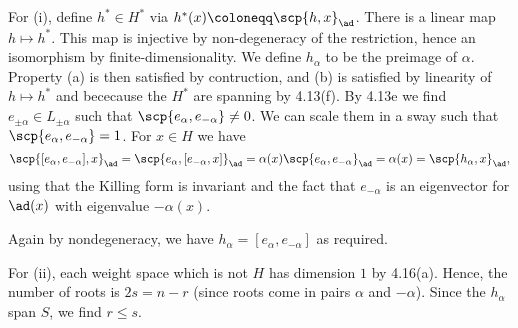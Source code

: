 For (i), define $h^* \in H^*$ via $h^*(x)\coloneqq \scp{h, x}_{\ad}$.
There is a linear map $h\mapsto h^*$. This map is injective by
non-degeneracy of the restriction, hence an isomorphism by finite-dimensionality.
We define  $h_\alpha$ to be the preimage of $\alpha$. Property (a) is then
satisfied by contruction, and (b) is satisfied by linearity of $h\mapsto h^*$ and
bececause the $H^*$ are spanning by 4.13(f). By 4.13e we find
$e_{\pm\alpha} \in L_{\pm\alpha}$ such that $\scp{e_\alpha, e_{-\alpha}}\neq 0$.
We can scale them in a sway such that $\scp{e_\alpha, e_{-\alpha}} = 1$.
For $x \in H$ we have
\[ \scp{[e_\alpha, e_{-\alpha}], x}_{\ad} = \scp{e_\alpha, [e_{-\alpha}, x]}_{\ad}
= \alpha(x)\scp{e_\alpha, e_{-\alpha}}_{\ad} = \alpha(x) = \scp{h_\alpha, x}_{\ad}, \]
using that the Killing form is invariant and the fact that $e_{-\alpha}$ is an
eigenvector for $\ad(x)$ with eigenvalue $-\alpha(x)$.

Again by nondegeneracy, we have $h_\alpha = [e_\alpha, e_{-\alpha}]$ as required.

For (ii), each weight space which is not $H$ has dimension $1$ by 4.16(a). Hence,
the number of roots is $2s = n - r$ (since roots come in pairs  $\alpha$ and $-\alpha$).
Since the $h_\alpha$ span $S$, we find $r\leq s$.
